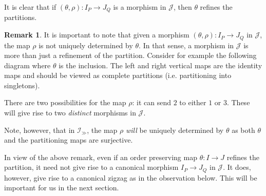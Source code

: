 \documentclass[12pt, reqno]{amsart}
\theoremstyle{plain}
\theoremstyle{definition}
\newtheorem{remark}[theorem]{Remark}
\begin{document}
It is clear that if $(\theta,\rho)\colon I_P\rightarrow J_Q$ is a morphism in $\mathcal{J}$, then $\theta$ refines the partitions.

\begin{remark}\label{refinement versus morphism}
It is important to note that given a morphism $(\theta, \rho)\colon I_P\rightarrow J_Q$ in $\mathcal{J}$, the map $\rho$ is not uniquely determined by $\theta$. In that sense, a morphism in $\mathcal{J}$ is more than just a refinement of the partition. Consider for example the following diagram where $\theta$ is the inclusion. The left and right vertical maps are the identity maps and should be viewed as complete partitions (i.e. partitioning into singletons). 
\begin{center}
\end{center}
There are two possibilities for the map $\rho$: it can send $2$ to either $1$ or $3$. These will give rise to two \textit{distinct} morphisms in $\mathcal{J}$.

Note, however, that in $\mathcal{I}_\gg$, the map $\rho$ \textit{will} be uniquely determined by $\theta$ as both $\theta$ and the partitioning maps are surjective.
\end{remark}

In view of the above remark, even if an order preserving map $\theta\colon I\rightarrow J$ refines the partition, it need not give rise to a canonical morphism $I_P\rightarrow J_Q$ in $\mathcal{J}$. It does, however, give rise to a canonical zigzag as in the observation below. This will be important for us in the next section.
\end{document}
